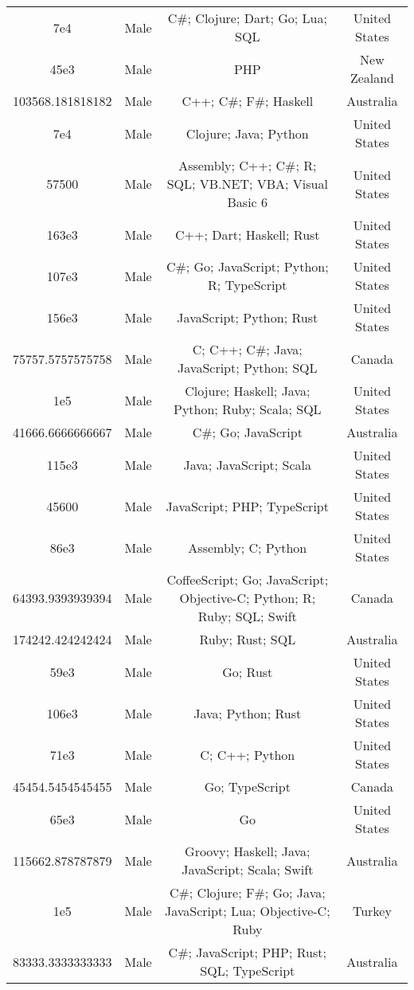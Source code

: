 \begin{center}
\begin{tabular}{ |c|c|c|c| }
7e4  &  Male  &  C\#; Clojure; Dart; Go; Lua; SQL  &  United States  \\ 
45e3  &  Male  &  PHP  &  New Zealand  \\ 
103568.181818182  &  Male  &  C++; C\#; F\#; Haskell  &  Australia  \\ 
7e4  &  Male  &  Clojure; Java; Python  &  United States  \\ 
57500  &  Male  &  Assembly; C++; C\#; R; SQL; VB.NET; VBA; Visual Basic 6  &  United States  \\ 
163e3  &  Male  &  C++; Dart; Haskell; Rust  &  United States  \\ 
107e3  &  Male  &  C\#; Go; JavaScript; Python; R; TypeScript  &  United States  \\ 
156e3  &  Male  &  JavaScript; Python; Rust  &  United States  \\ 
75757.5757575758  &  Male  &  C; C++; C\#; Java; JavaScript; Python; SQL  &  Canada  \\ 
1e5  &  Male  &  Clojure; Haskell; Java; Python; Ruby; Scala; SQL  &  United States  \\ 
41666.6666666667  &  Male  &  C\#; Go; JavaScript  &  Australia  \\ 
115e3  &  Male  &  Java; JavaScript; Scala  &  United States  \\ 
45600  &  Male  &  JavaScript; PHP; TypeScript  &  United States  \\ 
86e3  &  Male  &  Assembly; C; Python  &  United States  \\ 
64393.9393939394  &  Male  &  CoffeeScript; Go; JavaScript; Objective-C; Python; R; Ruby; SQL; Swift  &  Canada  \\ 
174242.424242424  &  Male  &  Ruby; Rust; SQL  &  Australia  \\ 
59e3  &  Male  &  Go; Rust  &  United States  \\ 
106e3  &  Male  &  Java; Python; Rust  &  United States  \\ 
71e3  &  Male  &  C; C++; Python  &  United States  \\ 
45454.5454545455  &  Male  &  Go; TypeScript  &  Canada  \\ 
65e3  &  Male  &  Go  &  United States  \\ 
115662.878787879  &  Male  &  Groovy; Haskell; Java; JavaScript; Scala; Swift  &  Australia  \\ 
1e5  &  Male  &  C\#; Clojure; F\#; Go; Java; JavaScript; Lua; Objective-C; Ruby  &  Turkey  \\ 
83333.3333333333  &  Male  &  C\#; JavaScript; PHP; Rust; SQL; TypeScript  &  Australia  \\ 

\end{tabular}
\end{center}
